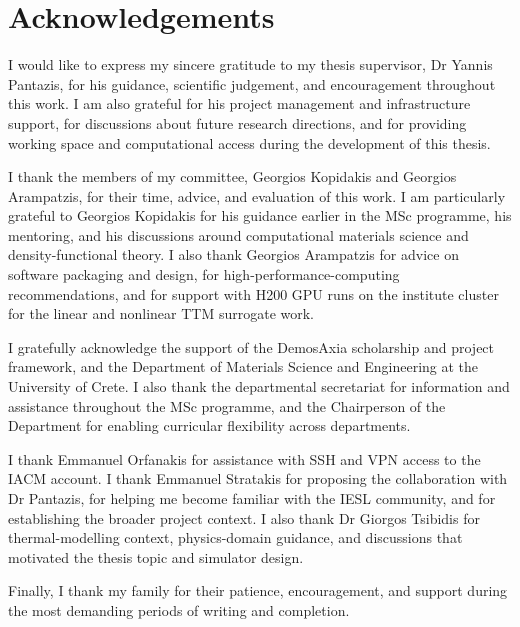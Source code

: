 \chapter*{Acknowledgements}

I would like to express my sincere gratitude to my thesis supervisor, Dr Yannis Pantazis, for his guidance, scientific judgement, and encouragement throughout this work. I am also grateful for his project management and infrastructure support, for discussions about future research directions, and for providing working space and computational access during the development of this thesis.

I thank the members of my committee, Georgios Kopidakis and Georgios Arampatzis, for their time, advice, and evaluation of this work. I am particularly grateful to Georgios Kopidakis for his guidance earlier in the MSc programme, his mentoring, and his discussions around computational materials science and density-functional theory. I also thank Georgios Arampatzis for advice on software packaging and design, for high-performance-computing recommendations, and for support with H200 GPU runs on the institute cluster for the linear and nonlinear TTM surrogate work.

I gratefully acknowledge the support of the DemosAxia scholarship and project framework, and the Department of Materials Science and Engineering at the University of Crete. I also thank the departmental secretariat for information and assistance throughout the MSc programme, and the Chairperson of the Department for enabling curricular flexibility across departments.

I thank Emmanuel Orfanakis for assistance with SSH and VPN access to the IACM account. I thank Emmanuel Stratakis for proposing the collaboration with Dr Pantazis, for helping me become familiar with the IESL community, and for establishing the broader project context. I also thank Dr Giorgos Tsibidis for thermal-modelling context, physics-domain guidance, and discussions that motivated the thesis topic and simulator design.

Finally, I thank my family for their patience, encouragement, and support during the most demanding periods of writing and completion.

